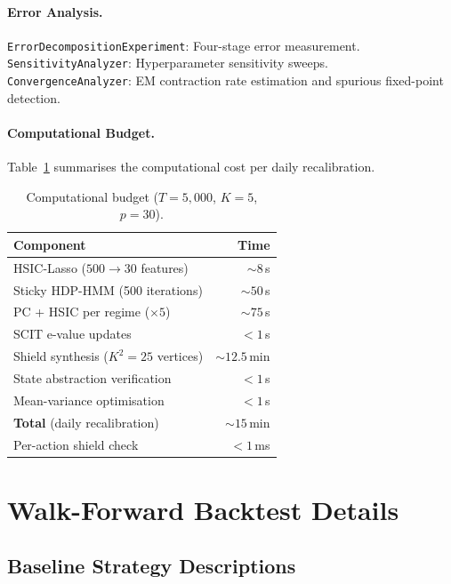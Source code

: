 \documentclass[11pt]{article}
\begin{document}
\paragraph{Error Analysis.}
\texttt{ErrorDecompositionExperiment}: Four-stage error measurement.
\texttt{SensitivityAnalyzer}: Hyperparameter sensitivity sweeps.
\texttt{ConvergenceAnalyzer}: EM contraction rate estimation and
spurious fixed-point detection.

\paragraph{Computational Budget.}
Table~\ref{tab:timing} summarises the computational cost per daily
recalibration.

\begin{table}[h]
\centering
\caption{Computational budget ($T{=}5{,}000$, $K{=}5$,
$p{=}30$).}\label{tab:timing}
\small
\begin{tabular}{@{}lr@{}}
\toprule
\textbf{Component} & \textbf{Time} \\
\midrule
HSIC-Lasso ($500 \to 30$ features)
  & ${\sim}8$\,s \\
Sticky HDP-HMM (500 iterations)
  & ${\sim}50$\,s \\
PC + HSIC per regime ($\times 5$)
  & ${\sim}75$\,s \\
SCIT e-value updates
  & ${<}1$\,s \\
Shield synthesis ($K^2{=}25$ vertices)
  & ${\sim}12.5$\,min \\
State abstraction verification
  & ${<}1$\,s \\
Mean-variance optimisation
  & ${<}1$\,s \\
\midrule
\textbf{Total} (daily recalibration)
  & ${\sim}15$\,min \\
Per-action shield check
  & ${<}1$\,ms \\
\bottomrule
\end{tabular}
\end{table}


\section{Walk-Forward Backtest Details}\label{app:backtest}

\subsection{Baseline Strategy Descriptions}
\end{document}

